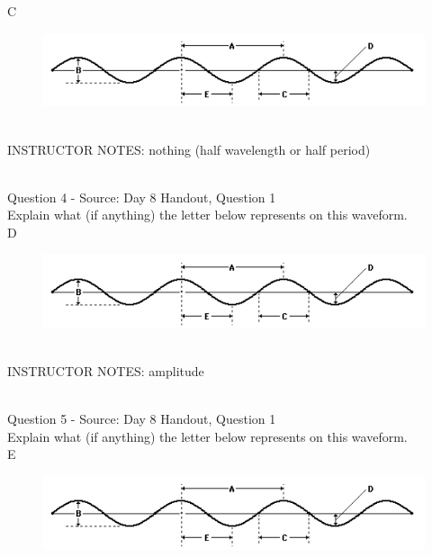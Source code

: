 \documentclass[12pt]{article}
\begin{document}
C

\begin{figure}[H]
\includegraphics{../images/sinusoid.png}
\end{figure}

~\\
INSTRUCTOR NOTES: nothing (half wavelength or half period)


~\\

{\large Question 4} - Source: Day 8 Handout, Question 1\\

Explain what (if anything) the letter below represents on this waveform.\\

D

\begin{figure}[H]
\includegraphics{../images/sinusoid.png}
\end{figure}

~\\
INSTRUCTOR NOTES: amplitude


~\\

{\large Question 5} - Source: Day 8 Handout, Question 1\\

Explain what (if anything) the letter below represents on this waveform.\\

E

\begin{figure}[H]
\includegraphics{../images/sinusoid.png}
\end{figure}
\end{document}
